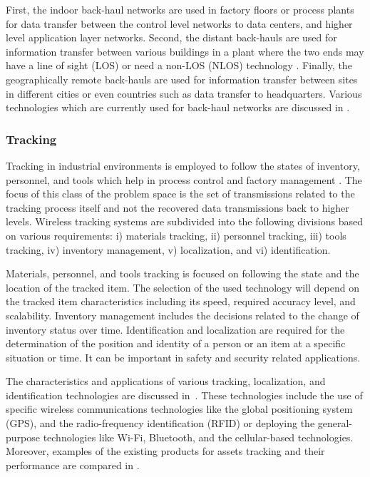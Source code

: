 First, the indoor back-haul networks are used in factory floors or process plants for data transfer between the control level networks to data centers, and higher level application layer networks. Second, the distant back-hauls are used for information transfer between various buildings in a plant where the two ends  may have a line of sight (LOS) or need a non-LOS (NLOS) technology \cite{PS-backhaul}. Finally, the geographically remote back-hauls are used for information transfer between sites in different cities or even countries such as data transfer to headquarters. Various technologies which are currently used for back-haul networks are discussed in \cite{PS-backhaul}.   
    
    \subsubsection{Tracking}
Tracking in industrial environments is employed to follow the states of inventory, personnel, and tools which help in process control and factory management \cite{PS_tracking2}. The focus of this class of the problem space is the set of transmissions related to the tracking process itself and not the recovered data transmissions back to higher levels. Wireless tracking systems are subdivided into the following divisions based on various requirements: i) materials tracking, ii) personnel tracking, iii) tools tracking, iv) inventory management, v) localization, and vi) identification. 

Materials, personnel, and tools tracking is focused on following the state and the location of the tracked item. The selection of the used technology will depend on the tracked item characteristics including its speed, required accuracy level, and scalability. Inventory management includes the decisions related to the change of inventory status over time. Identification and localization are required for the determination of the position and identity of a person or an item at a specific situation or time. It can be important in safety and security related applications. 

The characteristics and applications of various tracking, localization, and identification technologies are discussed in~\cite{PS_tracking2}. These technologies include the use of specific wireless communications technologies like the global positioning system (GPS), and the radio-frequency identification (RFID) or deploying the general-purpose technologies like Wi-Fi, Bluetooth, and the cellular-based technologies. Moreover, examples of the existing products for assets tracking and their performance are compared in \cite{PS-tracking1}.  


